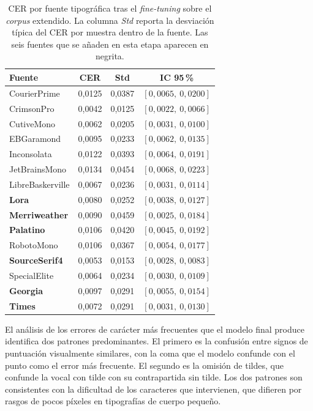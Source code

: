 \begin{table}[!htbp]
	\centering
	\caption{CER por fuente tipográfica tras el \textit{fine-tuning} sobre el \textit{corpus} extendido. La columna \emph{Std} reporta la desviación típica del CER por muestra dentro de la fuente. Las seis fuentes que se añaden en esta etapa aparecen en negrita.}
	\label{tab:cer-por-fuente-finetune}
	\begin{tabular}{lccc}
		\toprule
		\textbf{Fuente} & \textbf{CER} & \textbf{Std} & \textbf{IC 95\,\%} \\
		\midrule
		CourierPrime      & 0,0125 & 0,0387 & $[0{,}0065,\ 0{,}0200]$ \\
		CrimsonPro        & 0,0042 & 0,0125 & $[0{,}0022,\ 0{,}0066]$ \\
		CutiveMono        & 0,0062 & 0,0205 & $[0{,}0031,\ 0{,}0100]$ \\
		EBGaramond        & 0,0095 & 0,0233 & $[0{,}0062,\ 0{,}0135]$ \\
		Inconsolata       & 0,0122 & 0,0393 & $[0{,}0064,\ 0{,}0191]$ \\
		JetBrainsMono     & 0,0134 & 0,0454 & $[0{,}0068,\ 0{,}0223]$ \\
		LibreBaskerville  & 0,0067 & 0,0236 & $[0{,}0031,\ 0{,}0114]$ \\
		\textbf{Lora}     & 0,0080 & 0,0252 & $[0{,}0038,\ 0{,}0127]$ \\
		\textbf{Merriweather} & 0,0090 & 0,0459 & $[0{,}0025,\ 0{,}0184]$ \\
		\textbf{Palatino} & 0,0106 & 0,0420 & $[0{,}0045,\ 0{,}0192]$ \\
		RobotoMono        & 0,0106 & 0,0367 & $[0{,}0054,\ 0{,}0177]$ \\
		\textbf{SourceSerif4} & 0,0053 & 0,0153 & $[0{,}0028,\ 0{,}0083]$ \\
		SpecialElite      & 0,0064 & 0,0234 & $[0{,}0030,\ 0{,}0109]$ \\
		\textbf{Georgia}  & 0,0097 & 0,0291 & $[0{,}0055,\ 0{,}0154]$ \\
		\textbf{Times}    & 0,0072 & 0,0291 & $[0{,}0031,\ 0{,}0130]$ \\
		\bottomrule
	\end{tabular}
\end{table}

El análisis de los errores de carácter más frecuentes que el modelo final produce identifica dos patrones predominantes. El primero es la confusión entre signos de puntuación visualmente similares, con la coma que el modelo confunde con el punto como el error más frecuente. El segundo es la omisión de tildes, que confunde la vocal con tilde con su contrapartida sin tilde. Los dos patrones son consistentes con la dificultad de los caracteres que intervienen, que difieren por rasgos de pocos píxeles en tipografías de cuerpo pequeño.

